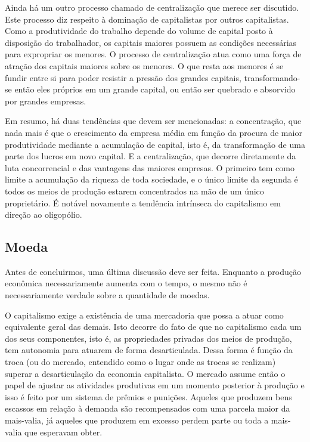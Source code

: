 Ainda há um outro processo chamado de centralização que merece ser discutido. Este processo diz respeito à dominação de capitalistas por outros capitalistas. Como a produtividade do trabalho depende do volume de capital posto à disposição do trabalhador, os capitais maiores possuem as condições necessárias para expropriar os menores. O processo de centralização atua como uma força de atração dos capitais maiores sobre os menores. O que resta aos menores é se fundir entre si para poder resistir a pressão dos grandes capitais, transformando-se então eles próprios em um grande capital, ou então ser quebrado e absorvido por grandes empresas.

Em resumo, há duas tendências que devem ser mencionadas: a concentração, que nada mais é que o crescimento da empresa média em função da procura de maior produtividade mediante a acumulação de capital, isto é, da transformação de uma parte dos lucros em novo capital. E a centralização, que decorre diretamente da luta concorrencial e das vantagens das maiores empresas. O primeiro tem como limite a acumulação da riqueza de toda sociedade, e o único limite da segunda é todos os meios de produção estarem concentrados na mão de um único proprietário. É notável novamente a tendência  intrínseca do capitalismo em direção ao oligopólio.

\subsection{Moeda}

Antes de concluirmos, uma última discussão deve ser feita. Enquanto a produção econômica necessariamente aumenta com o tempo, o mesmo não é necessariamente verdade sobre a quantidade de moedas.

O capitalismo exige a existência de uma mercadoria que possa a atuar como equivalente geral das demais. Isto decorre do fato de que no capitalismo cada um dos seus componentes,  isto é, as propriedades privadas dos meios de produção, tem autonomia para atuarem de forma desarticulada. Dessa forma é função da troca (ou do mercado, entendido como o lugar onde as trocas se realizam) superar a desarticulação da economia capitalista. O mercado assume então o papel de ajustar as atividades produtivas em um momento posterior à produção e isso é feito por um sistema de prêmios e punições. Aqueles que produzem bens escassos em relação à demanda são recompensados com uma parcela maior da mais-valia, já aqueles que produzem em excesso perdem parte ou toda a mais-valia que esperavam obter.

